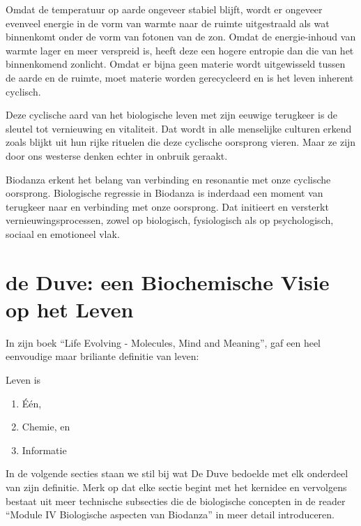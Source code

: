 \documentclass[
  11pt,
]{book}
\providecommand{\tightlist}{%
  \setlength{\itemsep}{0pt}\setlength{\parskip}{0pt}}
\begin{document}
Omdat de temperatuur op aarde ongeveer stabiel blijft, wordt er ongeveer evenveel energie in de vorm van warmte naar de ruimte uitgestraald als wat binnenkomt onder de vorm van fotonen van de zon. Omdat de energie-inhoud van warmte lager en meer verspreid is, heeft deze een hogere entropie dan die van het binnenkomend zonlicht. Omdat er bijna geen materie wordt uitgewisseld tussen de aarde en de ruimte, moet materie worden gerecycleerd en is het leven inherent cyclisch.

Deze cyclische aard van het biologische leven met zijn eeuwige terugkeer is de sleutel tot vernieuwing en vitaliteit. Dat wordt in alle menselijke culturen erkend zoals blijkt uit hun rijke rituelen die deze cyclische oorsprong vieren. Maar ze zijn door ons westerse denken echter in onbruik geraakt.

Biodanza erkent het belang van verbinding en resonantie met onze cyclische oorsprong. Biologische regressie in Biodanza is inderdaad een moment van terugkeer naar en verbinding met onze oorsprong. Dat initieert en versterkt vernieuwingsprocessen, zowel op biologisch, fysiologisch als op psychologisch, sociaal en emotioneel vlak.

\newpage

\hypertarget{de-duve-een-biochemische-visie-op-het-leven}{%
\section{de Duve: een Biochemische Visie op het Leven}\label{de-duve-een-biochemische-visie-op-het-leven}}

In zijn boek ``Life Evolving - Molecules, Mind and Meaning'', gaf \citet{deDuve2002} een heel eenvoudige maar briliante definitie van leven:

Leven is

\begin{enumerate}
\def\labelenumi{\arabic{enumi}.}
\tightlist
\item
  Één,
\item
  Chemie, en
\item
  Informatie
\end{enumerate}

In de volgende secties staan we stil bij wat De Duve bedoelde met elk onderdeel van zijn definitie. Merk op dat elke sectie begint met het kernidee en vervolgens bestaat uit meer technische subsecties die de biologische concepten in de reader ``Module IV Biologische aspecten van Biodanza'' in meer detail introduceren.
\end{document}
